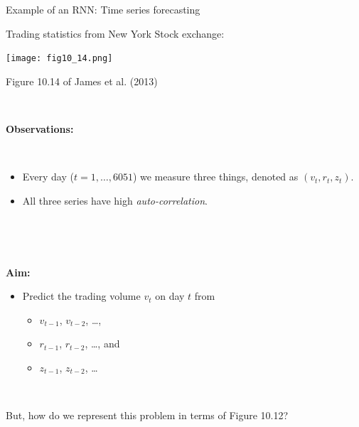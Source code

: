 \documentclass[
  10pt,
  ignorenonframetext,
  twocolumn]{beamer}
\providecommand{\tightlist}{%
  \setlength{\itemsep}{0pt}\setlength{\parskip}{0pt}}
\begin{document}
\begin{frame}
\begin{block}{Example of an RNN: Time series forecasting}
\label{example-of-an-rnn-time-series-forecasting}
\vspace{2mm}

Trading statistics from New York Stock exchange:

\centering

\texttt{[image: fig10\_14.png]}

\scriptsize Figure 10.14 of James et al. (2013)
\end{block}
\end{frame}

\begin{frame}
\(~\)

\textbf{Observations: }

\(~\)

\begin{itemize}
\item
  Every day (\(t=1,\ldots, 6051\)) we measure three things, denoted as
  \((v_t, r_t, z_t)\).
\item
  All three series have high \emph{auto-correlation}.
\end{itemize}

\(~\)

\(~\)

\textbf{Aim:}

\begin{itemize}
\tightlist
\item
  Predict the trading volume \(v_t\) on day \(t\) from

  \begin{itemize}
  \tightlist
  \item
    \(v_{t-1}\), \(v_{t-2}\), \ldots,
  \item
    \(r_{t-1}\), \(r_{t-2}\), \ldots, and
  \item
    \(z_{t-1}\), \(z_{t-2}\), \ldots{}
  \end{itemize}
\end{itemize}

\(~\)

But, how do we represent this problem in terms of Figure 10.12?
\end{frame}
\end{document}
